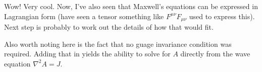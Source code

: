 \documentclass{article}
\newcommand{\grad}[0] {\nabla}
\begin{document}
Wow!  Very cool.  Now, I've also seen that Maxwell's equations can be expressed in Lagrangian form (have seen a tensor something like $F^{\mu\nu} F_{\mu\nu}$ used to express this).  Next step is probably to work out the details of how that would fit.

Also worth noting here is the fact that no guage invariance condition was required.  Adding that in yields the ability to solve for $A$ directly from the wave equation $\grad^2 A = J$.

\end{document}
